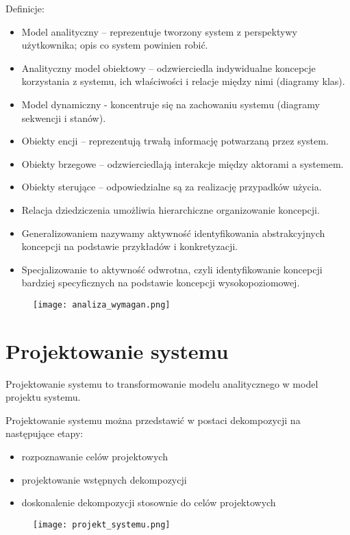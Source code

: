 \documentclass[a4paper]{article}
\begin{document}
Definicje:
\begin{itemize}
    \item Model analityczny – reprezentuje tworzony system z
perspektywy użytkownika; opis co system powinien robić.
    \item Analityczny model obiektowy – odzwierciedla indywidualne
koncepcje korzystania z systemu, ich właściwości i relacje
między nimi (diagramy klas).
    \item Model dynamiczny - koncentruje się na zachowaniu systemu
(diagramy sekwencji i stanów).
    \item Obiekty encji – reprezentują trwałą informację potwarzaną
    przez system.
    \item Obiekty brzegowe – odzwierciedlają interakcje między
    aktorami a systemem.
    \item Obiekty sterujące – odpowiedzialne są za realizację
    przypadków użycia.
    \item Relacja dziedziczenia umożliwia hierarchiczne
    organizowanie koncepcji.
    \item Generalizowaniem nazywamy aktywność identyfikowania
    abstrakcyjnych koncepcji na podstawie przykładów i
    konkretyzacji.
    \item Specjalizowanie to aktywność odwrotna, czyli
    identyfikowanie koncepcji bardziej specyficznych na
    podstawie koncepcji wysokopoziomowej.
\end{itemize}

    \begin{figure}[h]
        \texttt{[image: analiza\_wymagan.png]}
    \end{figure}

\section{Projektowanie systemu}
Projektowanie systemu to transformowanie
modelu analitycznego w model projektu systemu.

Projektowanie systemu można przedstawić w
postaci dekompozycji na następujące etapy:
\begin{itemize}
    \item rozpoznawanie celów projektowych
    \item projektowanie wstępnych dekompozycji
    \item doskonalenie dekompozycji stosownie do celów
projektowych
\end{itemize}

\begin{figure}[h]
    \texttt{[image: projekt\_systemu.png]}
\end{figure}
\end{document}

